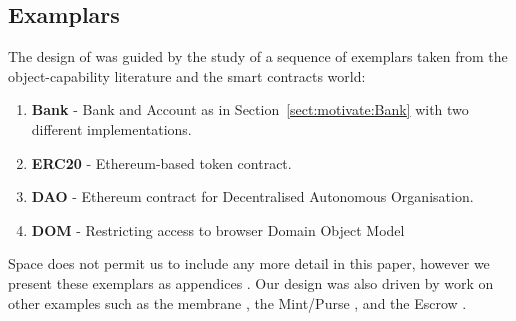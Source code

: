 

\subsection{Examplars}

The design of \Chainmail was guided by the study of a sequence of
exemplars taken from the object-capability literature and the smart
contracts world:

\begin{enumerate}
\item \textbf{Bank} \cite{arnd18} - Bank and Account as in
Section~\ref{sect:motivate:Bank} with two different implementations.
\item
\textbf{ERC20} \cite{ERC20} - Ethereum-based token contract.
\item
\textbf{DAO} \cite{Dao,DaoBug} - Ethereum contract for Decentralised Autonomous
Organisation.
\item
\textbf{DOM} \cite{dd,ddd} - Restricting access to browser Domain Object Model\\
\end{enumerate}

Space does not permit us to include any more detail in this paper,
however we present these exemplars as 
appendices \cite{examples}. Our design was also driven by work on other
examples such as the membrane \cite{membranesJavascript},
the Mint/Purse \cite{MillerPhD}, and the Escrow \cite{proxiesECOOP2013,swapsies}.


  





